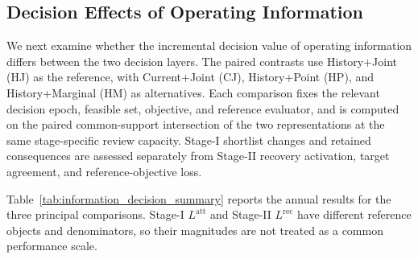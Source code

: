 \subsection{Decision Effects of Operating Information}
\label{subsec:results_information}

We next examine whether the incremental decision value of operating information differs between the two decision layers. The paired contrasts use History+Joint (HJ) as the reference, with Current+Joint (CJ), History+Point (HP), and History+Marginal (HM) as alternatives. Each comparison fixes the relevant decision epoch, feasible set, objective, and reference evaluator, and is computed on the paired common-support intersection of the two representations at the same stage-specific review capacity. Stage-I shortlist changes and retained consequences are assessed separately from Stage-II recovery activation, target agreement, and reference-objective loss.

Table~\ref{tab:information_decision_summary} reports the annual results for the three principal comparisons. Stage-I $L^{\mathrm{att}}$ and Stage-II $L^{\mathrm{rec}}$ have different reference objects and denominators, so their magnitudes are not treated as a common performance scale.


